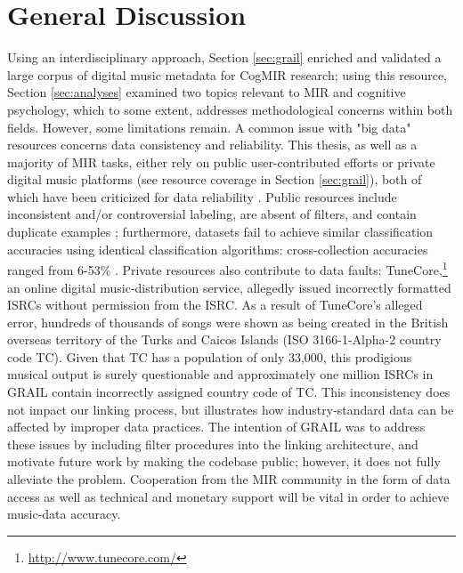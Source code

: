 \documentclass[a4paper]{article}
\begin{document}


\section{General Discussion}
Using an interdisciplinary approach, Section \ref{sec:grail} enriched and validated a large corpus of digital music metadata for CogMIR research; using this resource, Section \ref{sec:analyses} examined two topics relevant to MIR and cognitive psychology, which to some extent, addresses methodological concerns within both fields. However, some limitations remain. A common issue with "big data" resources concerns data consistency and reliability. This thesis, as well as a majority of MIR tasks, either rely on public user-contributed efforts \cite{swartz2002musicbrainz,sturm2012analysis} or private digital music platforms (see resource coverage in Section \ref{sec:grail}), both of which have been criticized for data reliability \cite{sturm2014state}. Public resources include inconsistent and/or controversial labeling, are absent of filters, and contain duplicate examples \cite{bogdanov2016cross}; furthermore, datasets fail to achieve similar classification accuracies using identical classification algorithms: cross-collection accuracies ranged from 6-53\% \cite{bogdanov2016cross}. Private resources also contribute to data faults: TuneCore,\footnote{\url{http://www.tunecore.com/}} an online digital music-distribution service, allegedly issued incorrectly formatted \Gls{ISRC}s without permission from the \Gls{ISRC}. As a result of TuneCore's alleged error, hundreds of thousands of songs were shown as being created in the British overseas territory of the Turks and Caicos Islands (ISO 3166-1-Alpha-2 country code TC). Given that TC has a population of only 33,000, this prodigious musical output is surely questionable and approximately one million \Gls{ISRC}s in \Gls{GRAIL} contain incorrectly assigned country code of TC. This inconsistency does not impact our linking process, but illustrates how industry-standard data can be affected by improper data practices. The intention of \Gls{GRAIL} was to address these issues by including filter procedures into the linking architecture, and motivate future work by making the codebase public; however, it does not fully alleviate the problem. Cooperation from the MIR community in the form of data access as well as technical and monetary support will be vital in order to achieve music-data accuracy.
\end{document}
